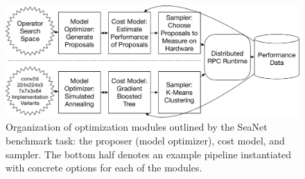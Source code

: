 \begin{figure}[tb]
\includegraphics[width=\textwidth]{sys_diagrams/plug.pdf}
\caption{
Organization of optimization modules outlined by the SeaNet benchmark task: the proposer (model optimizer), cost model, and sampler. The bottom half denotes an example pipeline instantiated with concrete options for each of the modules.}
\label{fig:sys_overview}
\end{figure}

